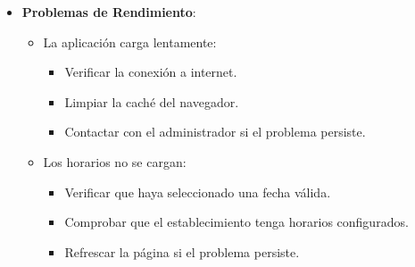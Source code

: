 \begin{itemize}
   \item \textbf{Problemas de Rendimiento}:
   \begin{itemize}
      \item La aplicación carga lentamente:
      \begin{itemize}
         \item Verificar la conexión a internet.
         \item Limpiar la caché del navegador.
         \item Contactar con el administrador si el problema persiste.
      \end{itemize}
      \item Los horarios no se cargan:
      \begin{itemize}
         \item Verificar que haya seleccionado una fecha válida.
         \item Comprobar que el establecimiento tenga horarios configurados.
         \item Refrescar la página si el problema persiste.
      \end{itemize}
   \end{itemize}
\end{itemize}
